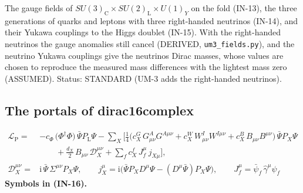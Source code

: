 \documentclass[
  10pt,
]{article}
\begin{document}
The gauge fields of
\(SU(3)_{\mathrm{C}} \times SU(2)_{\mathrm{L}} \times U(1)_Y\) on the
fold (IN-13), the three generations of quarks and leptons with three
right-handed neutrinos (IN-14), and their Yukawa couplings to the Higgs
doublet (IN-15). With the right-handed neutrinos the gauge anomalies
still cancel (DERIVED, \texttt{um3\_fields.py}), and the neutrino Yukawa
couplings give the neutrinos Dirac masses, whose values are chosen to
reproduce the measured mass differences with the lightest mass zero
(ASSUMED). Status: STANDARD (UM-3 adds the right-handed neutrinos).

\hypertarget{the-portals-of-dirac16complex}{%
\subsection{The portals of
dirac16complex}\label{the-portals-of-dirac16complex}}

\[
\begin{aligned}
\mathcal{L}_{\mathrm{P}} = {}&-c_\Phi\,\big(\Phi^\dagger\Phi\big)\,\bar\Psi P_{\mathrm{L}}\Psi
 - \sum_{X}\Big[\frac14\big(c^{G}_X\,G^A_{\mu\nu}G^{A\mu\nu} + c^{W}_X\,W^I_{\mu\nu}W^{I\mu\nu}
 + c^{B}_X\,B_{\mu\nu}B^{\mu\nu}\big)\,\bar\Psi P_X\Psi\\
&\qquad + \frac{d_X}{2}\,B_{\mu\nu}\,\mathcal{D}_X^{\mu\nu} + \sum_{f} c^{f}_X\,J_f^\mu\,j_{X\mu}\Big],\\
\mathcal{D}_X^{\mu\nu} = {}&\mathrm{i}\,\bar\Psi\,\Sigma^{\mu\nu}P_X\Psi,\qquad
j_X^\mu = \mathrm{i}\big(\bar\Psi P_X D^\mu\Psi - (D^\mu\bar\Psi)P_X\Psi\big),\qquad
J_f^\mu = \bar\psi_f\,\hat\gamma^\mu\psi_f
\end{aligned} \tag{IN-16}
\] \textbf{Symbols in (IN-16).}
\end{document}
